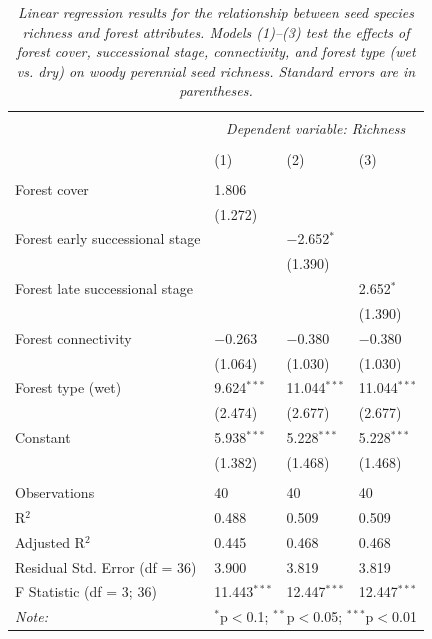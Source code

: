 \begin{table}[H]
\centering
\scriptsize %
\caption{\textit{Linear regression results for the relationship between seed species richness and forest attributes. Models (1)–(3) test the effects of forest cover, successional stage, connectivity, and forest type (wet vs. dry) on woody perennial seed richness. Standard errors are in parentheses.}}
\begin{tabularx}{\textwidth}{@{\extracolsep{3pt}}lXXX} 
\\[-1ex]\hline 
\hline \\[-1ex] 
 & \multicolumn{3}{c}{\textit{Dependent variable: Richness}} \\ 
\\[-1ex] & (1) & (2) & (3)\\ 
\hline \\[-0.8ex] 
Forest cover & 1.806 &  &  \\ 
 & (1.272) &  &  \\ 
Forest early successional stage &  & $-$2.652$^{*}$ &  \\ 
 &  & (1.390) &  \\ 
Forest late successional stage &  &  & 2.652$^{*}$ \\ 
 &  &  & (1.390) \\ 
Forest connectivity & $-$0.263 & $-$0.380 & $-$0.380 \\ 
 & (1.064) & (1.030) & (1.030) \\ 
Forest type (wet) & 9.624$^{***}$ & 11.044$^{***}$ & 11.044$^{***}$ \\ 
 & (2.474) & (2.677) & (2.677) \\ 
Constant & 5.938$^{***}$ & 5.228$^{***}$ & 5.228$^{***}$ \\ 
 & (1.382) & (1.468) & (1.468) \\ 
\hline \\[-0.8ex] 
Observations & 40 & 40 & 40 \\ 
R$^{2}$ & 0.488 & 0.509 & 0.509 \\ 
Adjusted R$^{2}$ & 0.445 & 0.468 & 0.468 \\ 
Residual Std. Error (df = 36) & 3.900 & 3.819 & 3.819 \\ 
F Statistic (df = 3; 36) & 11.443$^{***}$ & 12.447$^{***}$ & 12.447$^{***}$ \\ 
\hline 
\textit{Note:} & \multicolumn{3}{r}{$^{*}$p$<$0.1; $^{**}$p$<$0.05; $^{***}$p$<$0.01} \\ 
\end{tabularx} 
\label{tab:richness}
\end{table} 

